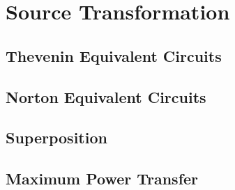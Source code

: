\chapter{Source Transformation}
\label{cha:source_transformation}
    \section{Thevenin Equivalent Circuits}
    \section{Norton Equivalent Circuits}
    \section{Superposition}
    \section{Maximum Power Transfer}